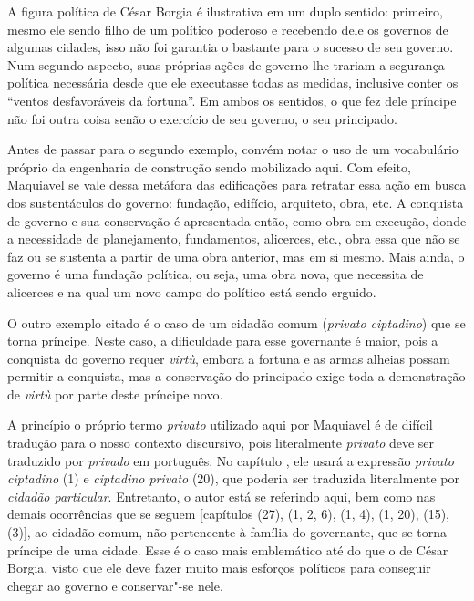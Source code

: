 A figura política de César Borgia é ilustrativa em um duplo sentido:
primeiro, mesmo ele sendo filho de um político poderoso e recebendo dele
os governos de algumas cidades, isso não foi garantia o bastante para o
sucesso de seu governo. Num segundo aspecto, suas próprias ações de
governo lhe trariam a segurança política necessária desde que ele
executasse todas as medidas, inclusive conter os ``ventos desfavoráveis
da fortuna''. Em ambos os sentidos, o que fez dele príncipe não foi
outra coisa senão o exercício de seu governo, o seu principado.

Antes de passar para o segundo exemplo, convém notar o uso de um
vocabulário próprio da engenharia de construção sendo mobilizado aqui.
Com efeito, Maquiavel se vale dessa metáfora das edificações para
retratar essa ação em busca dos sustentáculos do governo: fundação,
edifício, arquiteto, obra, etc. A conquista de governo e sua conservação
é apresentada então, como obra em execução, donde a necessidade de
planejamento, fundamentos, alicerces, etc., obra essa que não se faz ou
se sustenta a partir de uma obra anterior, mas em si mesmo. Mais ainda,
o governo é uma fundação política, ou seja, uma obra nova, que necessita
de alicerces e na qual um novo campo do político está sendo erguido.

O outro exemplo citado é o caso de um cidadão comum (\emph{privato
ciptadino}) que se torna príncipe. Neste caso, a dificuldade para esse
governante é maior, pois a conquista do governo requer \emph{virtù},
embora a fortuna e as armas alheias possam permitir a conquista, mas a
conservação do principado exige toda a demonstração de \emph{virtù} por
parte deste príncipe novo.

A princípio o próprio termo \emph{privato} utilizado aqui por Maquiavel
é de difícil tradução para o nosso contexto discursivo, pois
literalmente \emph{privato} deve ser traduzido por \emph{privado} em
português. No capítulo , ele usará a expressão \emph{privato
ciptadino} (1) e \emph{ciptadino privato} (20), que poderia ser
traduzida literalmente por \emph{cidadão particular}. Entretanto, o
autor está se referindo aqui, bem como nas demais ocorrências que se
seguem {[}capítulos  (27),  (1, 2, 6),  (1, 4),  (1, 20), 
(15),  (3){]}, ao cidadão comum, não pertencente à família do
governante, que se torna príncipe de uma cidade. Esse é o caso mais
emblemático até do que o de César Borgia, visto que ele deve fazer muito
mais esforços políticos para conseguir chegar ao governo e conservar"-se
nele.

